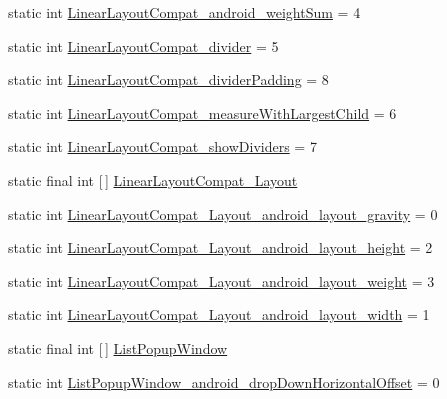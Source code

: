 \begin{DoxyCompactItemize}
\item 
static int \hyperlink{classandroid_1_1support_1_1v4_1_1R_1_1styleable_a60122618908d765ecf7a6397f21a692a}{Linear\+Layout\+Compat\+\_\+android\+\_\+weight\+Sum} = 4
\item 
static int \hyperlink{classandroid_1_1support_1_1v4_1_1R_1_1styleable_ad062fe8676838d9c14d62ca0905d04c7}{Linear\+Layout\+Compat\+\_\+divider} = 5
\item 
static int \hyperlink{classandroid_1_1support_1_1v4_1_1R_1_1styleable_af6bd9621cf5c129d0028c9ac57569dc4}{Linear\+Layout\+Compat\+\_\+divider\+Padding} = 8
\item 
static int \hyperlink{classandroid_1_1support_1_1v4_1_1R_1_1styleable_ae97a8388a99dc364d8df2d275288477c}{Linear\+Layout\+Compat\+\_\+measure\+With\+Largest\+Child} = 6
\item 
static int \hyperlink{classandroid_1_1support_1_1v4_1_1R_1_1styleable_abca207974c64d98f9f476c69a829e50e}{Linear\+Layout\+Compat\+\_\+show\+Dividers} = 7
\item 
static final int \mbox{[}$\,$\mbox{]} \hyperlink{classandroid_1_1support_1_1v4_1_1R_1_1styleable_ab5a97ab75cdbaa876aefad785e26581d}{Linear\+Layout\+Compat\+\_\+\+Layout}
\item 
static int \hyperlink{classandroid_1_1support_1_1v4_1_1R_1_1styleable_a49d947d9f6e72f06ba5b26a80b223714}{Linear\+Layout\+Compat\+\_\+\+Layout\+\_\+android\+\_\+layout\+\_\+gravity} = 0
\item 
static int \hyperlink{classandroid_1_1support_1_1v4_1_1R_1_1styleable_a0249aade0fe24357057c6ac83d2732fb}{Linear\+Layout\+Compat\+\_\+\+Layout\+\_\+android\+\_\+layout\+\_\+height} = 2
\item 
static int \hyperlink{classandroid_1_1support_1_1v4_1_1R_1_1styleable_a1059aee9c7c4ec5f7d463b5e086241b5}{Linear\+Layout\+Compat\+\_\+\+Layout\+\_\+android\+\_\+layout\+\_\+weight} = 3
\item 
static int \hyperlink{classandroid_1_1support_1_1v4_1_1R_1_1styleable_aa52fa646622d8180cb257bec9b9e78cc}{Linear\+Layout\+Compat\+\_\+\+Layout\+\_\+android\+\_\+layout\+\_\+width} = 1
\item 
static final int \mbox{[}$\,$\mbox{]} \hyperlink{classandroid_1_1support_1_1v4_1_1R_1_1styleable_ae85d6bb2c9931c00d078ecfff851c634}{List\+Popup\+Window}
\item 
static int \hyperlink{classandroid_1_1support_1_1v4_1_1R_1_1styleable_a3bbedcbea2481b0e13e1e96a900a4e4b}{List\+Popup\+Window\+\_\+android\+\_\+drop\+Down\+Horizontal\+Offset} = 0
\item 

\end{DoxyCompactItemize}
